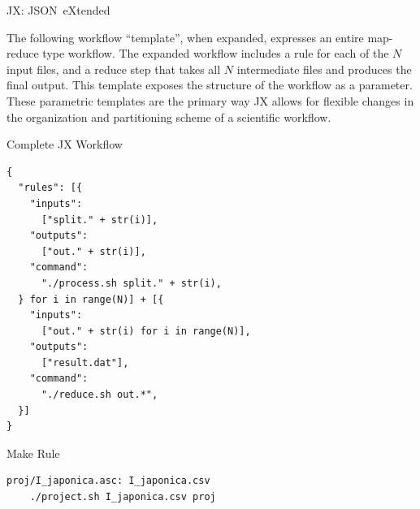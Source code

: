 \documentclass{beamer}
\newcommand{\jx}{JX\xspace}
\newcommand{\extrafun}{JSON~eXtended\xspace}
\begin{document}
\begin{frame}[fragile]
\begin{minipage}[t][0.97\textheight]{0.65\textwidth}
\begin{minipage}[t][0.85\textheight]{0.48\textwidth}
\begin{alertblock}{\jx: \extrafun\rule{0pt}{2.1ex}}
{\vspace{16pt}

The following workflow ``template'', when expanded,
expresses an entire map-reduce type workflow.
The expanded workflow includes a rule for each of the $N$ input files,
and a reduce step that takes all $N$ intermediate files and produces the final output.
This template exposes the structure of the workflow as a parameter.
These parametric templates are the primary way \jx allows for flexible changes in the organization and partitioning scheme of a scientific workflow.}
\end{alertblock}

\vfill

\begin{exampleblock}{Complete JX Workflow\rule{0pt}{2.1ex}}
\begin{verbatim}
{
  "rules": [{
    "inputs":
      ["split." + str(i)],
    "outputs":
      ["out." + str(i)],
    "command":
      "./process.sh split." + str(i),
  } for i in range(N)] + [{
    "inputs":
      ["out." + str(i) for i in range(N)],
    "outputs":
      ["result.dat"],
    "command":
      "./reduce.sh out.*",
  }]
}
\end{verbatim}
\end{exampleblock}

\vfill

\end{minipage}

\begin{block}{}
\begin{center}
\end{center}
\end{block}

\end{minipage}\hfill
\begin{minipage}[t][0.95\textheight]{0.33\textwidth}

\begin{exampleblock}{Make Rule\rule{0pt}{2.1ex}}
\begin{verbatim}
proj/I_japonica.asc: I_japonica.csv
    ./project.sh I_japonica.csv proj
\end{verbatim}
\end{exampleblock}


\end{minipage}
\end{frame}
\end{document}
